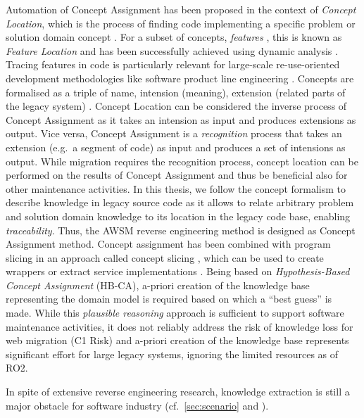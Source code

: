Automation of Concept Assignment has been proposed in the context of \emph{Concept Location}, which is the process of finding code implementing a specific problem or solution domain concept \autocite{Marcus2004ProblemLocation}.
For a subset of concepts, \emph{features} \autocite{Rajlich2002Concepts}, this is known as \emph{Feature Location} and has been successfully achieved using dynamic analysis \autocite{Rubin2013FeatureLocation}.
Tracing features in code is particularly relevant for large-scale re-use-oriented development methodologies like software product line engineering \autocite{Rubin2013FeatureLocation}.
Concepts are formalised as a triple of name, intension (meaning), extension (related parts of the legacy system) \autocite{Chen2010FeatureLocation}.
Concept Location can be considered the inverse process of Concept Assignment as it takes an intension as input and produces extensions as output.
Vice versa, Concept Assignment is a \emph{recognition} process that takes an extension (e.g.~a segment of code) as input and produces a set of intensions as output.
\autocite{Chen2010FeatureLocation} While migration requires the recognition process, concept location can be performed on the results of Concept Assignment and thus be beneficial also for other maintenance activities.
In this thesis, we follow the concept formalism to describe knowledge in legacy source code as it allows to relate arbitrary problem and solution domain knowledge to its location in the legacy code base, enabling \emph{traceability}.
Thus, the AWSM reverse engineering method is designed as Concept Assignment method.
Concept assignment has been combined with program slicing in an approach called concept slicing \autocite{Gold2005ConceptSlicing}, which can be used to create wrappers \autocite{Canfora2000Decomposing} or extract service implementations \autocite{Khadka2011ServiciFi}.
Being based on \emph{Hypothesis-Based Concept Assignment} (HB-CA), a-priori creation of the knowledge base representing the domain model is required based on which a ``best guess'' \autocite{Gold2005ConceptSlicing} is made.
While this \emph{plausible reasoning} approach \autocite{Biggerstaff1993ConceptAssignmentICSE} is sufficient to support software maintenance activities, it does not reliably address the risk of knowledge loss for web migration (C1 Risk) and a-priori creation of the knowledge base represents significant effort for large legacy systems, ignoring the limited resources as of RO2.

In spite of extensive reverse engineering research, knowledge extraction is still a major obstacle for software industry (cf.~\cref{sec:scenario} and \autocite{Khadka2014ProfessionalsModernization,Batlajery2014IndustrialSurveyModernization}).

